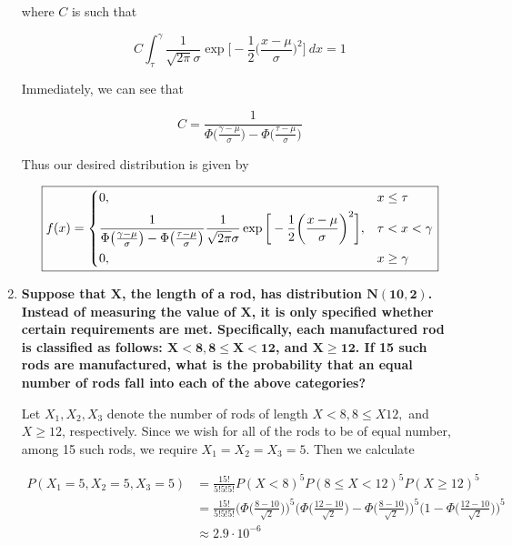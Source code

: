 \documentclass[10pt, oneside]{article}   	%
\theoremstyle{definition}
\begin{document}
\begin{enumerate}[label=9.\arabic*]
where $C$ is such that

\[ C \int^\gamma_\tau \frac{1}{\sqrt{2\pi} \sigma} \exp \bigg[ -\frac{1}{2} \bigg( \frac{x-\mu}{\sigma} \bigg)^2 \bigg] \ dx = 1  \]

Immediately, we can see that

\[ C = \frac{1}{\Phi \big( \frac{\gamma - \mu}{\sigma} \big) - \Phi \big( \frac{\tau - \mu}{\sigma} \big) } \]

Thus our desired distribution is given by

\[
\boxed{
f(x) = \begin{dcases}
0, & x \leq \tau \\
\frac{1}{\Phi \big( \frac{\gamma - \mu}{\sigma} \big) - \Phi \big( \frac{\tau - \mu}{\sigma} \big) } \frac{1}{\sqrt{2\pi} \sigma} \exp \bigg[ -\frac{1}{2} \bigg( \frac{x-\mu}{\sigma} \bigg)^2 \bigg], & \tau < x < \gamma \\
0, & x \geq \gamma
\end{dcases}
}
\]

\item  \begin{tcolorbox}[
  colback=Cerulean!5!white,
  colframe=Cerulean!75!black]
\textbf{Suppose that $\bm{X}$, the length of a rod, has distribution $\bm{N(10,2)}$. Instead of measuring the value of $\bm{X}$, it is only specified whether certain requirements are met. Specifically, each manufactured rod is classified as follows: $\bm{X < 8, 8 \leq X < 12}$, and $\bm{X \geq 12}$. If 15 such rods are manufactured, what is the probability that an equal number of rods fall into each of the above categories?}
\end{tcolorbox}

Let $X_1, X_2, X_3$ denote the number of rods of length $X < 8, 8 \leq X 12,$ and $X \geq 12$, respectively. Since we wish for all of the rods to be of equal number, among 15 such rods, we require $X_1 = X_2 = X_3 = 5$. Then we calculate

\begin{align*}
P(X_1 = 5, X_2 = 5, X_3 = 5) &= \frac{15!}{5! 5! 5!} P(X < 8)^5 P(8 \leq X < 12)^5 P(X \geq 12)^5 \\
&= \frac{15!}{5! 5! 5!} \bigg( \Phi \bigg( \frac{8-10}{\sqrt{2}} \bigg) \bigg)^5 \bigg( \Phi \bigg( \frac{12-10}{\sqrt{2}} \bigg) - \Phi \bigg( \frac{8-10}{\sqrt{2}} \bigg) \bigg)^5 \bigg( 1- \Phi \bigg( \frac{12-10}{\sqrt{2}} \bigg) \bigg)^5 \\
&\approx \boxed{2.9 \cdot 10^{-6}}
\end{align*}


\end{enumerate}
\end{document}
